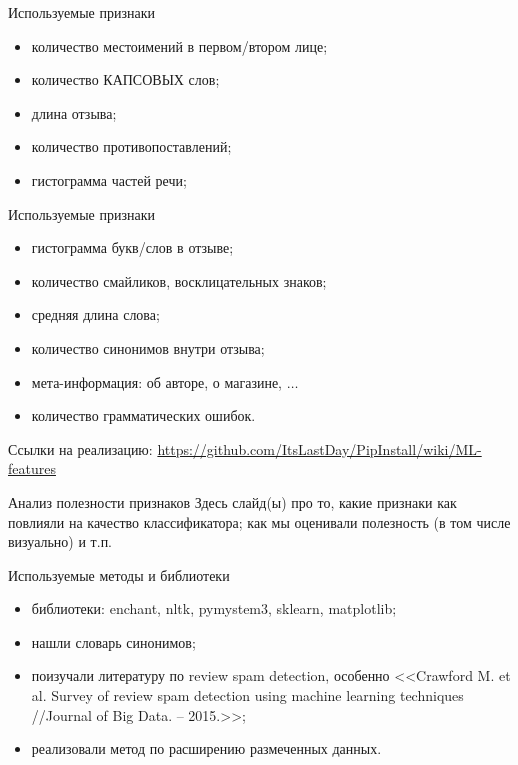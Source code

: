 \documentclass[mathserif,utf8,14pt]{beamer}
\begin{document}
\begin{frame}{Используемые признаки}
    \begin{itemize}
        \item количество местоимений в первом/втором лице;
        \item количество КАПСОВЫХ слов;
        \item длина отзыва;
        \item количество противопоставлений;
        \item гистограмма частей речи;
    \end{itemize}
\end{frame}

\begin{frame}{Используемые признаки}
     \addtocounter{framenumber}{-1}
    \begin{itemize}
        \item гистограмма букв/слов в отзыве;
        \item количество смайликов, восклицательных знаков;
        \item средняя длина слова;
        \item количество синонимов внутри отзыва;
        \item мета-информация: об авторе, о магазине, $\ldots$
        \item количество грамматических ошибок.
    \end{itemize}
    Ссылки на реализацию: \url{https://github.com/ItsLastDay/PipInstall/wiki/ML-features}
\end{frame}

\begin{frame}{Анализ полезности признаков}
    Здесь слайд(ы) про то, какие признаки как повлияли на качество классификатора;
    как мы оценивали полезность (в том числе визуально) и т.п.
\end{frame}

\begin{frame}{Используемые методы и библиотеки}
    \begin{itemize}
        \item библиотеки: enchant, nltk, pymystem3, sklearn, matplotlib;
        \item нашли словарь синонимов;
        \item поизучали литературу по review spam detection, особенно
            <<Crawford M. et al. Survey of review spam detection using machine learning techniques //Journal of Big Data. – 2015.>>;
        \item реализовали метод по расширению размеченных данных.
    \end{itemize}
\end{frame}
\end{document}
